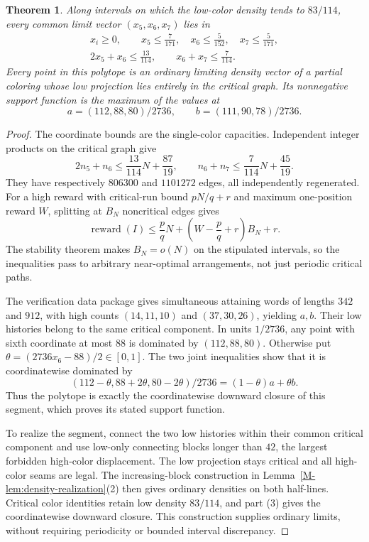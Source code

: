 \documentclass[11pt,reqno]{amsart}
\theoremstyle{plain}
\newtheorem{theorem}{Theorem}
\theoremstyle{plain}
\theoremstyle{plain}
\begin{document}
\begin{theorem}\label{M-thm:three-high-region}
Along intervals on which the low-color density tends to $83/114$, every
common limit vector $(x_5,x_6,x_7)$ lies in
\begin{equation}\label{M-eq:three-high-region}
 \begin{gathered}
 x_i\ge0,\qquad x_5\le\frac7{171},\quad
 x_6\le\frac5{152},\quad x_7\le\frac5{171},\\
 2x_5+x_6\le\frac{13}{114},\qquad
 x_6+x_7\le\frac7{114}.
 \end{gathered}
\end{equation}
Every point in this polytope is an ordinary limiting density vector of
a partial coloring whose low projection lies entirely in the critical
graph. Its nonnegative support function is the maximum of the values at
\[
 a=(112,88,80)/2736,\qquad b=(111,90,78)/2736.
\]
\end{theorem}
\begin{proof}
The coordinate bounds are the single-color capacities. Independent
integer products on the critical graph give
\[
 2n_5+n_6\le\frac{13}{114}N+\frac{87}{19},\qquad
 n_6+n_7\le\frac7{114}N+\frac{45}{19}.
\]
They have respectively $806300$ and $1101272$ edges, all independently
regenerated. For a high reward with critical-run bound $pN/q+r$ and
maximum one-position reward $W$, splitting at $B_N$ noncritical edges gives
\[
 \operatorname{reward}(I)\le\frac pq N+
 \left(W-\frac pq+r\right)B_N+r.
\]
The stability theorem makes $B_N=o(N)$ on the stipulated intervals,
so the inequalities pass to arbitrary near-optimal arrangements, not just
periodic critical paths.

The verification data package gives simultaneous attaining words of lengths $342$ and
$912$, with high counts $(14,11,10)$ and $(37,30,26)$, yielding $a,b$.
Their low histories belong to the same critical component. In units
$1/2736$, any point with sixth coordinate at most $88$ is dominated by
$(112,88,80)$. Otherwise put $\theta=(2736x_6-88)/2\in[0,1]$.
The two joint inequalities show that it is coordinatewise dominated by
\[
 (112-\theta,88+2\theta,80-2\theta)/2736
 =(1-\theta)a+\theta b.
\]
Thus the polytope is exactly the coordinatewise downward closure of this
segment, which proves its stated support function.

To realize the segment, connect the two low histories within their
common critical component and use low-only connecting blocks longer
than $42$, the largest forbidden high-color displacement. The low
projection stays critical and all high-color seams are legal.
The increasing-block construction in Lemma~\ref{M-lem:density-realization}(2)
then gives ordinary densities on both half-lines. Critical color
identities retain low density $83/114$, and part (3) gives the
coordinatewise downward closure. This construction supplies ordinary
limits, without requiring periodicity or bounded interval discrepancy.
\end{proof}
\end{document}
